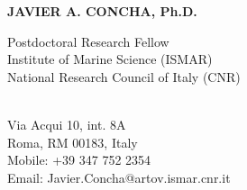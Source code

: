 \documentclass[11pt]{res} %
\begin{document}
 
{\centering \Large \bf JAVIER A. CONCHA, Ph.D.\par} %
\vspace{0.2in}                                         
\begin{multicols}{2}
{\raggedright Postdoctoral Research Fellow\\Institute of Marine Science (ISMAR)\\ National Research Council of Italy (CNR)\\ ~~~~~~~~~~~~~~~~~~~~~~~~~~~~~~~~~~~\\}
{\raggedleft Via Acqui 10, int. 8A\\Roma, RM 00183, Italy\\Mobile: +39 347 752 2354\\Email: Javier.Concha@artov.ismar.cnr.it\\}
\end{multicols}
\vspace{-0.4in} 
\hrulefill
\end{document}
